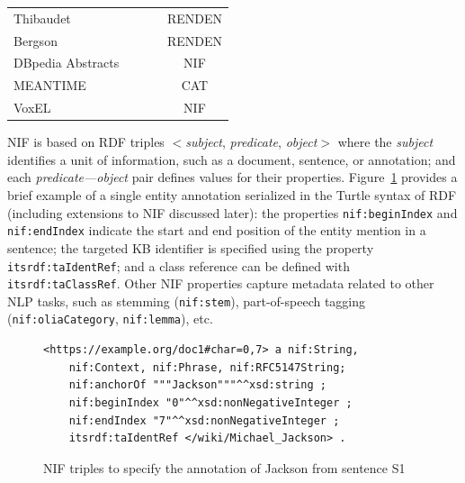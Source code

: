 \documentclass[sigconf]{acmart}
\newcommand{\cmark}{\ding{51}}%
\newcommand{\xmark}{\ding{55}}%
\begin{document}
\begin{table}[tb!]
\begin{tabular}{lccc}
Thibaudet~\cite{renden2016}         &\xmark &\cmark & RENDEN  \\ %
Bergson~\cite{renden2016}           &\xmark &\cmark & RENDEN  \\ %
DBpedia Abstracts
~\cite{abstracts2016}               &\xmark &\xmark & NIF \\ %
MEANTIME~\cite{meantime2016}        &\cmark &\cmark & CAT \\ %
VoxEL~\cite{VoxEL2018}              &\cmark &\xmark & NIF \\%
\bottomrule
\end{tabular}
\end{table}


NIF is based on RDF triples $<$\textit{subject}, \textit{predicate}, \textit{object}$>$ where the \textit{subject} identifies a unit of information, such as a document, sentence, or annotation; and each \textit{predicate---object} pair defines values for their properties. Figure~\ref{fig:nif} provides a brief example of a single entity annotation serialized in the Turtle syntax of RDF (including extensions to NIF discussed later): the properties \texttt{nif:beginIndex} and \texttt{nif:endIndex} indicate the start and end position of the entity mention in a sentence; the targeted KB identifier is specified using the property \texttt{itsrdf:taIdentRef}; and a class reference can be defined with \texttt{itsrdf:taClassRef}. Other NIF properties capture metadata related to other NLP tasks, such as stemming (\texttt{nif:stem}), part-of-speech tagging (\texttt{nif:oliaCategory}, \texttt{nif:lemma}), etc.


\begin{figure}
\caption{NIF triples to specify the annotation of Jackson from sentence S1}
\label{fig:nif}
\begin{Verbatim}[frame=single]
<https://example.org/doc1#char=0,7> a nif:String,
    nif:Context, nif:Phrase, nif:RFC5147String;
    nif:anchorOf """Jackson"""^^xsd:string ;
    nif:beginIndex "0"^^xsd:nonNegativeInteger ;
    nif:endIndex "7"^^xsd:nonNegativeInteger ;
    itsrdf:taIdentRef </wiki/Michael_Jackson> .
\end{Verbatim}
\end{figure}
\end{document}
